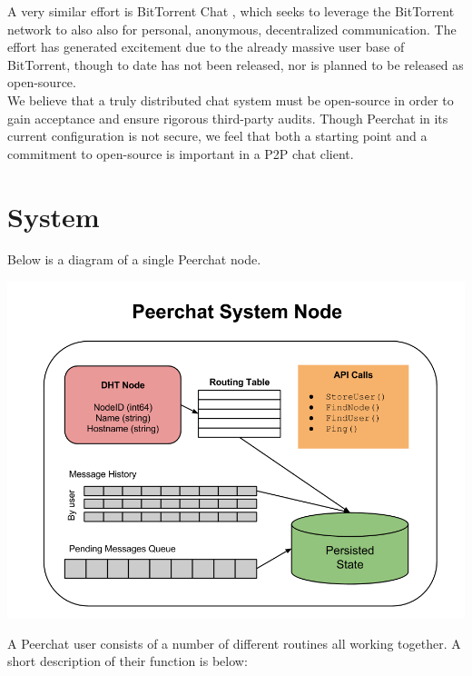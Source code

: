 \documentclass{article}
\begin{document}
A very similar effort is BitTorrent Chat \cite{Goldoor13}, which seeks to leverage the BitTorrent network to also also for personal, anonymous, decentralized communication. The effort has generated excitement due to the already massive user base of BitTorrent, though to date has not been released, nor is planned to be released as open-source. \\

We believe that a truly distributed chat system must be open-source in order to gain acceptance and ensure rigorous third-party audits. Though Peerchat in its current configuration is not secure, we feel that both a starting point and a commitment to open-source is important in a P2P chat client. 

\section{System}

Below is a diagram of a single Peerchat node. 

\includegraphics[scale=0.5]{peerchat}

A Peerchat user consists of a number of different routines all working together. A short description of their function is below: \\
\end{document}
